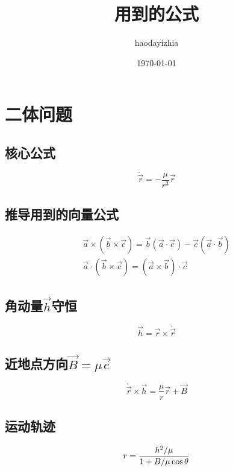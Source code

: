 \documentclass[UTF8]{ctexart}
\title{用到的公式}
\author{haodayizhia}
\date{\today}
\begin{document}
\renewcommand\theequation{%
\thesection.\arabic{equation}}

\maketitle
\tableofcontents
\section{二体问题}

\subsection{核心公式}
\begin{equation}
	\ddot{\vec{r}}=-\frac{\mu}{r^3}\vec{r}
\end{equation}

\subsection{推导用到的向量公式}

\begin{gather}
\vec{a}\times(\vec{b}\times\vec c) =\vec{b}(\vec{a}\cdot\vec{c})-\vec{c}(\vec{a}\cdot\vec{b})\\
\vec{a}\cdot(\vec{b}\times\vec{c})=(\vec{a}\times\vec{b})\cdot\vec{c}
\end{gather}

\subsection{角动量$\vec{h}$守恒}
\begin{equation}
	\vec{h}=\vec{r}\times\dot{\vec{r}}
\end{equation}

\subsection{近地点方向$\vec{B}=\mu\vec{e}$}
\begin{equation}
	\dot{\vec{r}}\times\vec{h}=\frac{\mu}{r}\vec{r}+\vec{B}
\end{equation}

\subsection{运动轨迹}
\begin{equation}
	r=\frac{h^2/\mu}{1+B/\mu\cos \theta}\\
\end{equation}
\end{document}
